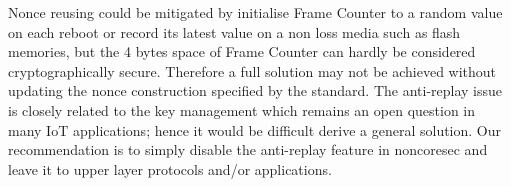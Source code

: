 Nonce reusing could be mitigated by initialise Frame Counter to a random value on each reboot or record its latest value on a non loss media such as flash memories, but the 4 bytes space of Frame Counter can hardly be considered cryptographically secure. Therefore a full solution may not be achieved without updating the nonce construction specified by the standard\cite{802154}. The anti-replay issue is closely related to the key management which remains an open question in many IoT applications; hence it would be difficult derive a general solution. Our recommendation is to simply disable the anti-replay feature in noncoresec and leave it to upper layer protocols and/or applications.